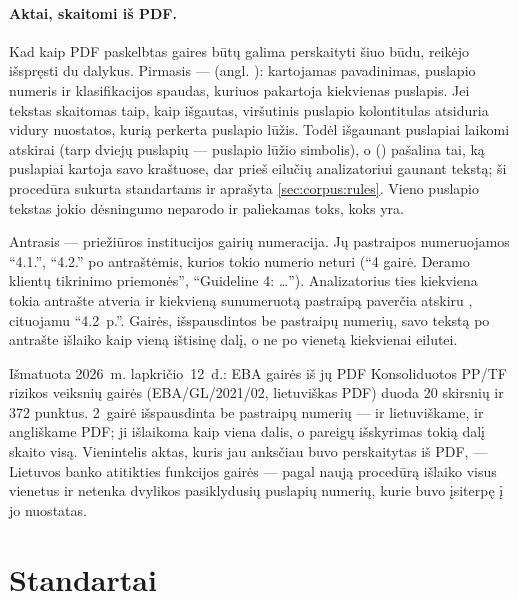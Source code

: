 \paragraph{Aktai, skaitomi iš PDF.} Kad kaip PDF paskelbtas gaires būtų galima perskaityti šiuo
būdu, reikėjo išspręsti du dalykus. Pirmasis ---  (angl. ): kartojamas pavadinimas, puslapio numeris ir klasifikacijos spaudas, kuriuos
pakartoja kiekvienas puslapis. Jei tekstas skaitomas taip, kaip išgautas, viršutinis puslapio kolontitulas
atsiduria vidury nuostatos, kurią perkerta puslapio lūžis. Todėl išgaunant puslapiai laikomi
atskirai (tarp dviejų puslapių --- puslapio lūžio simbolis), o 
() pašalina tai, ką puslapiai kartoja savo kraštuose, dar prieš
eilučių analizatoriui gaunant tekstą; ši procedūra sukurta standartams ir aprašyta
\cref{sec:corpus:rules}. Vieno puslapio tekstas jokio dėsningumo neparodo ir paliekamas toks,
koks yra.

Antrasis --- priežiūros institucijos gairių numeracija. Jų pastraipos numeruojamos
\enquote{4.1.}, \enquote{4.2.} po antraštėmis, kurios tokio numerio neturi
(\enquote{4 gairė. Deramo klientų tikrinimo priemonės}, \enquote{Guideline 4: …}).
Analizatorius ties kiekviena tokia antrašte atveria  ir kiekvieną sunumeruotą
pastraipą paverčia atskiru , cituojamu \enquote{4.2~p.}. Gairės, išspausdintos be
pastraipų numerių, savo tekstą po antrašte išlaiko kaip vieną ištisinę dalį, o ne po vienetą
kiekvienai eilutei.

\begin{lessonbox}{Išmatuota 2026~m. lapkričio~12~d.: EBA gairės iš jų PDF}
Konsoliduotos PP/TF rizikos veiksnių gairės (EBA/GL/2021/02, lietuviškas PDF) duoda 20
skirsnių ir 372 punktus. 2~gairė išspausdinta be pastraipų numerių --- ir lietuviškame, ir
angliškame PDF; ji išlaikoma kaip viena dalis, o pareigų išskyrimas tokią dalį skaito visą.
Vienintelis aktas, kuris jau anksčiau buvo perskaitytas iš PDF, --- Lietuvos banko atitikties
funkcijos gairės --- pagal naują procedūrą išlaiko visus vienetus ir netenka dvylikos
pasiklydusių puslapių numerių, kurie buvo įsiterpę į jo nuostatas.
\end{lessonbox}


\section{Standartai}\label{sec:corpus:standards}

